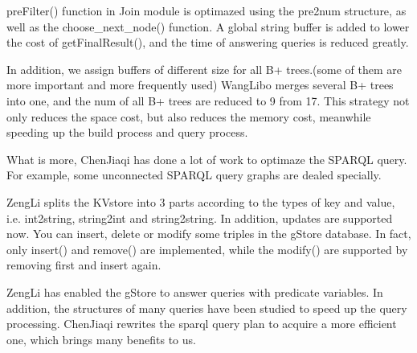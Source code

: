\documentclass[titlepage, a4paper, 12pt]{article}
\begin{document}
\clearpage



preFilter() function in Join module is optimazed using the pre2num structure, as well as the choose\_next\_node() function.
A global string buffer is added to lower the cost of getFinalResult(), and the time of answering queries is reduced greatly.

In addition, we assign buffers of different size for all B+ trees.(some of them are more important and more frequently used)
WangLibo merges several B+ trees into one, and the num of all B+ trees are reduced to 9 from 17.
This strategy not only reduces the space cost, but also reduces the memory cost, meanwhile speeding up the build process and query process.

What is more, ChenJiaqi has done a lot of work to optimaze the SPARQL query.
For example, some unconnected SPARQL query graphs are dealed specially.


ZengLi splits the KVstore into 3 parts according to the types of key and value, i.e. int2string, string2int and string2string.
In addition, updates are supported now. 
You can insert, delete or modify some triples in the gStore database.
In fact, only insert() and remove() are implemented, while the modify() are supported by removing first and insert again.


ZengLi has enabled the gStore to answer queries with predicate variables. 
In addition, the structures of many queries have been studied to speed up the query processing.
ChenJiaqi rewrites the sparql query plan to acquire a more efficient one, which brings many benefits to us.
\end{document}
